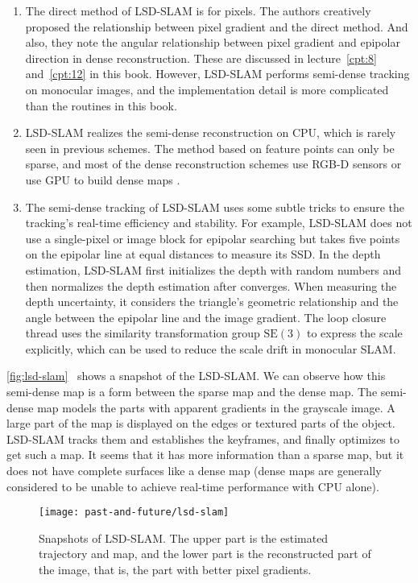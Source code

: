 \begin{enumerate}
	\item The direct method of LSD-SLAM is for pixels. The authors creatively proposed the relationship between pixel gradient and the direct method. And also, they note the angular relationship between pixel gradient and epipolar direction in dense reconstruction. These are discussed in lecture~\ref{cpt:8} and~\ref{cpt:12} in this book. However, LSD-SLAM performs semi-dense tracking on monocular images, and the implementation detail is more complicated than the routines in this book.
	\item LSD-SLAM realizes the semi-dense reconstruction on CPU, which is rarely seen in previous schemes. The method based on feature points can only be sparse, and most of the dense reconstruction schemes use RGB-D sensors or use GPU to build dense maps {\cite{Kerl2013}}. 
	\item The semi-dense tracking of LSD-SLAM uses some subtle tricks to ensure the tracking's real-time efficiency and stability. For example, LSD-SLAM does not use a single-pixel or image block for epipolar searching but takes five points on the epipolar line at equal distances to measure its SSD. In the depth estimation, LSD-SLAM first initializes the depth with random numbers and then normalizes the depth estimation after converges. When measuring the depth uncertainty, it considers the triangle's geometric relationship and the angle between the epipolar line and the image gradient. The loop closure thread uses the similarity transformation group $\mathrm{SE}(3)$ to express the scale explicitly, which can be used to reduce the scale drift in monocular SLAM.
\end{enumerate}

\autoref{fig:lsd-slam}~ shows a snapshot of the LSD-SLAM. We can observe how this semi-dense map is a form between the sparse map and the dense map. The semi-dense map models the parts with apparent gradients in the grayscale image. A large part of the map is displayed on the edges or textured parts of the object. LSD-SLAM tracks them and establishes the keyframes, and finally optimizes to get such a map. It seems that it has more information than a sparse map, but it does not have complete surfaces like a dense map (dense maps are generally considered to be unable to achieve real-time performance with CPU alone).

\begin{figure}[!ht]
	\centering
	\texttt{[image: past-and-future/lsd-slam]}
	\caption{Snapshots of LSD-SLAM. The upper part is the estimated trajectory and map, and the lower part is the reconstructed part of the image, that is, the part with better pixel gradients.}
	\label{fig:lsd-slam}
\end{figure}

